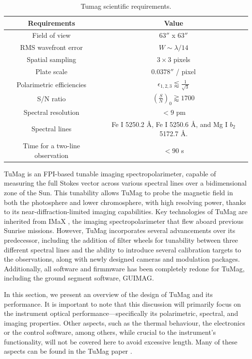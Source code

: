 \begin{table}
    \centering
   \begin{tabular}{cc}
    \hline
    \hline
    Requirements & Value \\
    \hline
    Field of view & $63''$ x $63''$ \\
    RMS wavefront error & $W \sim \lambda / 14$\\
    Spatial sampling & $3 \times 3 $ pixels \\
    Plate scale & $0.0378''$ / pixel \\
    Polarimetric efficiencies & $\epsilon _ {1, 2, 3} \lessapprox \frac{1}{\sqrt{3}}$\\
    S/N ratio & $\left(\frac{S}{N}\right) _ 0 \gtrapprox 1700$ \\
    Spectral resolution & $< 9$ pm\\  
    Spectral lines & Fe I 5250.2 \r{A}, Fe I 5250.6 \r{A}, and Mg I $b_2$ 5172.7 \r{A}. \\
    Time for a two-line observation & $< 90$ s\\
    \hline
    \hline
    \end{tabular}
    \caption{Tumag scientific requirements.}
    \label{table: Tumags requirements}
\end{table}

TuMag is an FPI-based tunable imaging spectropolarimeter, capable of measuring the full Stokes vector across various spectral lines over a bidimensional zone of the Sun. This tunability allows TuMag to probe the magnetic field in both the photosphere and lower chromosphere, with high resolving power, thanks to its near-diffraction-limited imaging capabilities. Key technologies of TuMag are inherited from IMaX \citep{IMaX}, the imaging spectropolarimeter that flew aboard previous Sunrise missions. However, TuMag incorporates several advancements over its predecessor, including the addition of filter wheels for tunability between three different spectral lines and the ability to introduce several calibration targets to the observations, along with newly designed cameras and modulation packages. Additionally, all software and firmmware has been completely redone for TuMag, including the ground segment software, GUIMAG.

In this section, we present an overview of the design of TuMag  and its performance. It is important to note that this discussion will primarily focus on the instrument optical performance—specifically its polarimetric, spectral, and imaging properties. Other aspects, such as the thermal behaviour, the electronics or the control software, among others, while crucial to the instrument's functionality, will not be covered here to avoid excessive length. Many of these aspects can be found in the TuMag paper \citep{tumag}.

